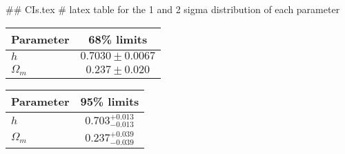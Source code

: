 ## CIs.tex
# latex table for the 1 and 2 sigma distribution of each parameter

\begin{tabular} { l  c}
 Parameter &  68\% limits\\
\hline
{\boldmath$h              $} & $0.7030\pm 0.0067          $\\
{\boldmath$\Omega_m       $} & $0.237\pm 0.020            $\\
\hline
\end{tabular}

\begin{tabular} { l  c}
 Parameter &  95\% limits\\
\hline
{\boldmath$h              $} & $0.703^{+0.013}_{-0.013}   $\\
{\boldmath$\Omega_m       $} & $0.237^{+0.039}_{-0.039}   $\\
\hline
\end{tabular}
